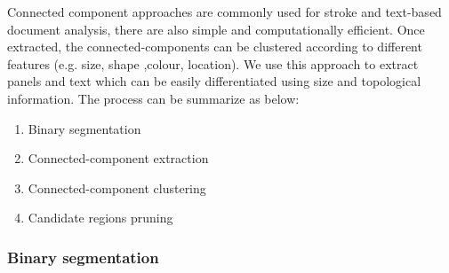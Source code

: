 Connected component approaches are commonly used for stroke and text-based document analysis, there are also simple and computationally efficient.
Once extracted, the connected-components can be clustered according to different features (e.g. size, shape ,colour, location).
We use this approach to extract panels and text which can be easily differentiated using size and topological information.
The process can be summarize as below:
  \begin{enumerate}
	\item Binary segmentation
	\item Connected-component extraction
	\item Connected-component clustering
	\item Candidate regions pruning
  \end{enumerate}


\subsubsection{Binary segmentation} %
\label{par:se:image_segmentation}

